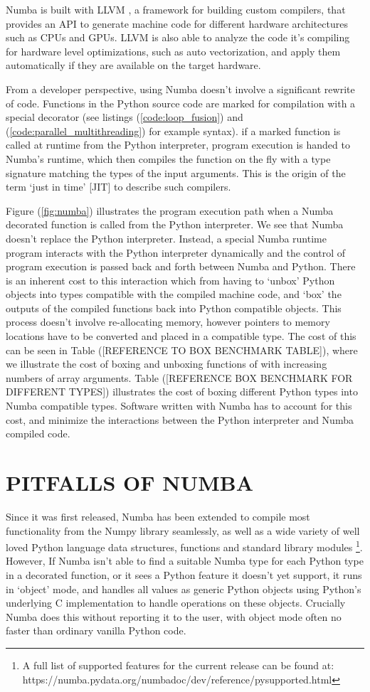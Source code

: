 \documentclass{IEEEcsmag}
\begin{document}
Numba is built with LLVM \cite{Lattner2004}, a framework for building custom compilers, that provides an API to generate machine code for different hardware architectures such as CPUs and GPUs. LLVM is also able to analyze the code it's compiling for hardware level optimizations, such as auto vectorization, and apply them automatically if they are available on the target hardware.

From a developer perspective, using Numba doesn't involve a significant rewrite of code. Functions in the Python source code are marked for compilation with a special decorator (see listings (\ref{code:loop_fusion}) and (\ref{code:parallel_multithreading}) for example syntax). if a marked function is called at runtime from the Python interpreter, program execution is handed to Numba's runtime, which then compiles the function on the fly with a type signature matching the types of the input arguments. This is the origin of the term `just in time' [JIT] to describe such compilers.

Figure (\ref{fig:numba}) illustrates the program execution path when a Numba decorated function is called from the Python interpreter. We see that Numba doesn't replace the Python interpreter. Instead, a special Numba runtime program interacts with the Python interpreter dynamically and the control of program execution is passed back and forth between Numba and Python. There is an inherent cost to this interaction which from having to `unbox' Python objects into types compatible with the compiled machine code, and `box' the outputs of the compiled functions back into Python compatible objects. This process doesn't involve re-allocating memory, however pointers to memory locations have to be converted and placed in a compatible type. The cost of this can be seen in Table ([REFERENCE TO BOX BENCHMARK TABLE]), where we illustrate the cost of boxing and unboxing functions of with increasing numbers of array arguments. Table ([REFERENCE BOX BENCHMARK FOR DIFFERENT TYPES]) illustrates the cost of boxing different Python types into Numba compatible types. Software written with Numba has to account for this cost, and minimize the interactions between the Python interpreter and Numba compiled code.

\section{PITFALLS OF NUMBA}

Since it was first released, Numba has been extended to compile most functionality from the Numpy library seamlessly, as well as a wide variety of well loved Python language data structures, functions and standard library modules \footnote{A full list of supported features for the current release can be found at: https://numba.pydata.org/numba\-doc/dev/reference/pysupported.html}. However, If Numba isn't able to find a suitable Numba type for each Python type in a decorated function, or it sees a Python feature it doesn't yet support, it runs in `object' mode, and handles all values as generic Python objects using Python's underlying C implementation to handle operations on these objects. Crucially Numba does this without reporting it to the user, with object mode often no faster than ordinary vanilla Python code.
\end{document}
